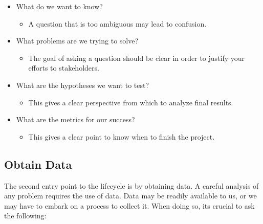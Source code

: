 \documentclass[
  letterpaper,
  DIV=11,
  numbers=noendperiod]{scrreprt}
\providecommand{\tightlist}{%
  \setlength{\itemsep}{0pt}\setlength{\parskip}{0pt}}\usepackage{longtable,booktabs,array}
\begin{document}
\begin{itemize}
\tightlist
\item
  What do we want to know?

  \begin{itemize}
  \tightlist
  \item
    A question that is too ambiguous may lead to confusion.
  \end{itemize}
\item
  What problems are we trying to solve?

  \begin{itemize}
  \tightlist
  \item
    The goal of asking a question should be clear in order to justify
    your efforts to stakeholders.
  \end{itemize}
\item
  What are the hypotheses we want to test?

  \begin{itemize}
  \tightlist
  \item
    This gives a clear perspective from which to analyze final results.
  \end{itemize}
\item
  What are the metrics for our success?

  \begin{itemize}
  \tightlist
  \item
    This gives a clear point to know when to finish the project.
  \end{itemize}
\end{itemize}

\hypertarget{obtain-data}{%
\subsection{Obtain Data}\label{obtain-data}}

The second entry point to the lifecycle is by obtaining data. A careful
analysis of any problem requires the use of data. Data may be readily
available to us, or we may have to embark on a process to collect it.
When doing so, its crucial to ask the following:
\end{document}
